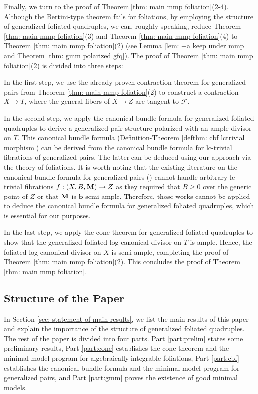 \documentclass[11pt]{amsart}
\numberwithin{equation}{section}
\newcommand{\bb}{\bm{b}}
\newcommand{\Mm}{{\bf{M}}}
\newcommand{\Ff}{\mathcal{F}}
\theoremstyle{definition}
\theoremstyle{definition}
\theoremstyle{definition}
\begin{document}
Finally, we turn to the proof of Theorem \ref{thm: main mmp foliation}(2-4). Although the Bertini-type theorem fails for foliations, by employing the structure of generalized foliated quadruples, we can, roughly speaking, reduce Theorem \ref{thm: main mmp foliation}(3) and Theorem \ref{thm: main mmp foliation}(4) to Theorem \ref{thm: main mmp foliation}(2) (see Lemma \ref{lem: +a keep under mmp} and Theorem \ref{thm: gmm polarized gfq}). The proof of Theorem \ref{thm: main mmp foliation}(2) is divided into three steps:

In the first step, we use the already-proven contraction theorem for generalized pairs from Theorem \ref{thm: main mmp foliation}(2) to construct a contraction $X\rightarrow T$, where the general fibers of $X\rightarrow Z$ are tangent to $\Ff$.

In the second step, we apply the canonical bundle formula for generalized foliated quadruples to derive a generalized pair structure polarized with an ample divisor on $T$. This canonical bundle formula (Definition-Theorem \ref{defthm: cbf lctrivial morphism}) can be derived from the canonical bundle formula for lc-trivial fibrations of generalized pairs. The latter can be deduced using our approach via the theory of foliations. It is worth noting that the existing literature on the canonical bundle formula for generalized pairs (\cite{Fil19,Fil20,JLX22,FS23}) cannot handle arbitrary lc-trivial fibrations $f: (X,B,\Mm) \rightarrow Z$ as they required that $B\geq 0$ over the generic point of $Z$ or that $\Mm$ is $\bb$-semi-ample. Therefore, those works cannot be applied to deduce the canonical bundle formula for generalized foliated quadruples, which is essential for our purposes.

In the last step, we apply the cone theorem for generalized foliated quadruples to show that the generalized foliated log canonical divisor on $T$ is ample. Hence, the foliated log canonical divisor on $X$ is semi-ample, completing the proof of Theorem \ref{thm: main mmp foliation}(2). This concludes the proof of Theorem \ref{thm: main mmp foliation}.







\subsection{Structure of the Paper} In Section \ref{sec: statement of main results}, we list the main results of this paper and explain the importance of the structure of generalized foliated quadruples. The rest of the paper is divided into four parts. Part \ref{part:prelim} states some preliminary results, Part \ref{part:cone} establishes the cone theorem and the minimal model program for algebraically integrable foliations, Part \ref{part:cbf} establishes the canonical bundle formula and the minimal model program for generalized pairs, and Part \ref{part:gmm} proves the existence of good minimal models.
\end{document}

